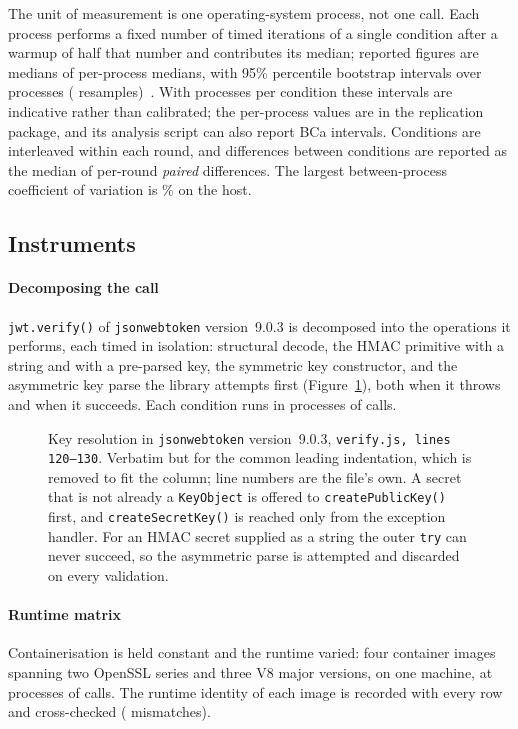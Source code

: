 \documentclass[preprint,12pt,authoryear]{elsarticle}
\newcommand{\LibraryName}{\texttt{jsonwebtoken}}
\newcommand{\LibraryVersion}{version~9.0.3}
\newcommand{\CodeFileLines}{verify.js, lines 120--130}
\newcommand{\CodeFirstLine}{120}
\begin{document}
The unit of measurement is one operating-system process, not one call. Each
process performs a fixed number of timed iterations of a single condition after
a warmup of half that number and contributes its median; reported figures are
medians of per-process medians, with 95\% percentile bootstrap intervals over
processes (\BootstrapResamples{} resamples)~\citep{georges2007statistically}.
With \HostInvocations{} processes per condition these intervals are indicative
rather than calibrated; the per-process values are in the replication package,
and its analysis script can also report BCa intervals. Conditions are interleaved within
each round, and differences between conditions are reported as the median of
per-round \emph{paired} differences. The largest between-process coefficient of
variation is \HostCvMax\% on the host.

\subsection{Instruments}\label{sec:decompose}

\paragraph{Decomposing the call} \texttt{jwt.verify()} of \LibraryName{}
\LibraryVersion{} is decomposed into the operations it performs, each timed in
isolation: structural decode, the HMAC primitive with a string and with a
pre-parsed key, the symmetric key constructor, and the asymmetric key parse the
library attempts first (Figure~\ref{fig:codepath}), both when it throws and
when it succeeds. Each condition runs in \HostInvocations{} processes of
\HostCallsPerInvocation{} calls.

\begin{figure}[!t]

\caption{Key resolution in \LibraryName{} \LibraryVersion{},
\texttt{\CodeFileLines}. Verbatim but for the common leading indentation,
which is removed to fit the column; line numbers are the file's own. A secret
that is not already a \texttt{KeyObject} is offered to
\texttt{createPublicKey()} first, and \texttt{createSecretKey()} is reached only
from the exception handler. For an HMAC secret supplied as a string the outer
\texttt{try} can never succeed, so the asymmetric parse is attempted and
discarded on every validation.}
\label{fig:codepath}
\end{figure}

\paragraph{Runtime matrix}\label{sec:matrix-method} Containerisation is held
constant and the runtime varied: four container images spanning two OpenSSL
series and three V8 major versions, on one machine, at \MatrixInvocations{}
processes of \MatrixCallsPerInvocation{} calls. The runtime identity of each
image is recorded with every row and cross-checked (\IdentityMismatches{}
mismatches).
\end{document}
